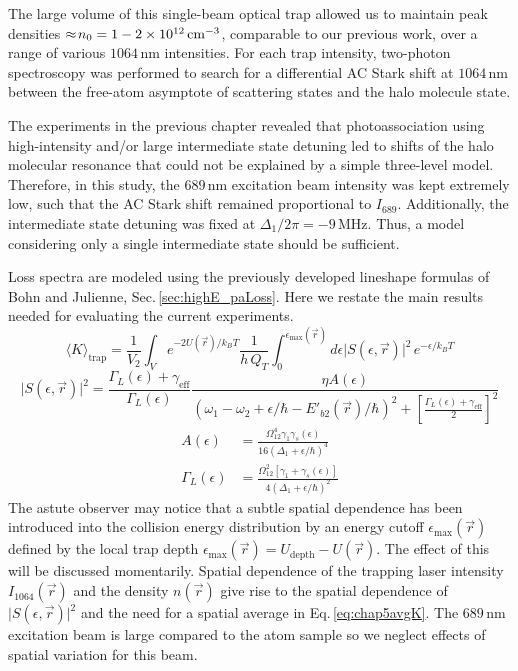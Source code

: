 The large volume of this single-beam optical trap allowed us to maintain peak densities $\approx\!n_0 = 1-2 \times 10^{12} \, \text{cm}^{-3}$, comparable to our previous work, over a range of various $1064$\,nm intensities.
For each trap intensity, two-photon spectroscopy was performed to search for a differential AC Stark shift at $1064\,\text{nm}$ between the free-atom asymptote of scattering states and the halo molecule state.

The experiments in the previous chapter revealed that photoassociation using high-intensity and/or large intermediate state detuning led to shifts of the halo molecular resonance that could not be explained by a simple three-level model.
Therefore, in this study, the $689$\,nm excitation beam intensity was kept extremely low, such that the AC Stark shift remained proportional to $I_{689}$.
Additionally, the intermediate state detuning was fixed at $\Delta_1/2 \pi = -9$\,MHz.
Thus, a model considering only a single intermediate state should be sufficient.

Loss spectra are modeled using the previously developed lineshape formulas of Bohn and Julienne, Sec.\,\ref{sec:highE_paLoss}.
Here we restate the main results needed for evaluating the current experiments.
\begingroup
\addtolength{\jot}{1em}
\begin{equation} \label{eq:chap5avgK}
	\langle K \rangle_\text{trap} = \frac{1}{V_2} \int_V e^{-2 U(\vec{r})/k_{B}T} \frac{1}{h\,Q_{T}} \int_{0}^{\epsilon_{\text{max}}(\vec{r})} d\epsilon \vert S(\epsilon, \vec{r}) \vert^2 \,e^{-\epsilon/k_{B}T}
\end{equation}
\begin{equation}\label{5equationApproxLorentzian}
  \vert S(\epsilon, \vec{r}) \vert^2 = \frac{\Gamma_L(\epsilon)+\gamma_{\text{eff}}}{\Gamma_L(\epsilon)} \frac{\eta  A(\epsilon)} {\left(\omega_1-\omega_2+\epsilon/\hbar-E'_{b2}(\vec{r})/\hbar\right)^2+\left[
  	\frac{\Gamma_L(\epsilon)+\gamma_{\text{eff}}}{2}\right]^2}
\end{equation}
\begin{align}
  A(\epsilon) &= \frac{\Omega_{12}^{4}\gamma_1 \gamma_s(\epsilon)}{16(\Delta_1+\epsilon/\hbar)^4} \\
  \Gamma_L(\epsilon) &= \frac{\Omega_{12}^{2}[\gamma_1 +\gamma_s(\epsilon)]}{4(\Delta_1+\epsilon/\hbar)^2}
\end{align}
\endgroup
The astute observer may notice that a subtle spatial dependence has been introduced into the collision energy distribution by an energy cutoff $\epsilon_{\text{max}}(\vec{r})$ defined by the local trap depth $\epsilon_{\text{max}}(\vec{r}) = U_{\text{depth}} - U(\vec{r})$.
The effect of this will be discussed momentarily.
Spatial dependence of the trapping laser intensity $I_{1064}(\vec{r})$ and the density $n(\vec{r})$ give rise to the spatial dependence of $\vert S(\epsilon, \vec{r}) \vert^2$ and the need for a spatial average in Eq.\,\ref{eq:chap5avgK}.
The $689$\,nm excitation beam is large compared to the atom sample so we neglect effects of spatial variation for this beam.


